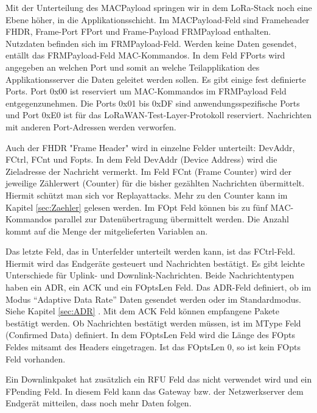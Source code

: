 \documentclass[a4paper, 12pt]{article}
\begin{document}
                Mit der Unterteilung des MACPayload springen wir in dem LoRa-Stack noch eine Ebene höher, in die 
                Applikationsschicht. Im MACPayload-Feld sind Frameheader FHDR, Frame-Port FPort und 
                Frame-Payload FRMPayload enthalten. Nutzdaten befinden sich im FRMPayload-Feld. Werden keine
                Daten gesendet, entällt das FRMPayload-Feld MAC-Kommandos. In dem Feld FPorts wird 
                angegeben an welchen Port und somit an welche Teilapplikation des Applikationsserver die Daten geleitet 
                werden sollen. Es gibt einige fest definierte Ports. Port 0x00 ist reserviert um MAC-Kommandos im FRMPayload Feld 
                entgegenzunehmen. Die Ports 0x01 bis 0xDF sind anwendungsspezifische Ports und Port 0xE0 ist für das 
                LoRaWAN-Test-Layer-Protokoll reserviert. Nachrichten mit anderen Port-Adressen werden verworfen. 

                Auch der FHDR "Frame Header" wird in einzelne Felder unterteilt: DevAddr, FCtrl, FCnt und Fopts. 
                In dem Feld DevAddr (Device Address) wird die Zieladresse der Nachricht vermerkt. Im Feld FCnt 
                (Frame Counter) wird der 
                jeweilige Zählerwert (Counter) für die bisher gezählten Nachrichten übermittelt. Hiermit schützt man sich vor 
                Replayattacks. Mehr zu den Counter kann im Kapitel \ref{sec:Zaehler}  gelesen werden. Im FOpt Feld 
                können bis zu fünf MAC-Kommandos parallel zur Datenübertragung übermittelt werden. Die Anzahl kommt auf die Menge der 
                mitgelieferten Variablen an. 

                Das letzte Feld, das in Unterfelder unterteilt werden kann, ist das FCtrl-Feld. Hiermit wird das Endgeräte 
                gesteuert und Nachrichten bestätigt. Es gibt leichte Unterschiede für Uplink- und Downlink-Nachrichten. 
                Beide Nachrichtentypen haben ein ADR, ein ACK und ein FOptsLen Feld. Das ADR-Feld definiert, 
                ob im Modus ``Adaptive Data Rate'' Daten gesendet werden oder im Standardmodus. Siehe Kapitel \ref{sec:ADR} . 
                Mit dem ACK Feld können empfangene Pakete bestätigt werden. Ob Nachrichten bestätigt werden müssen,
                ist im MType Feld (Confirmed Data) definiert. In dem FOptsLen Feld wird die Länge des FOpts Feldes mitsamt des 
                Headers eingetragen. Ist das FOptsLen 0, so ist kein FOpts Feld vorhanden.

                Ein Downlinkpaket hat zusätzlich ein RFU Feld das nicht verwendet wird und ein FPending Feld. In diesem 
                Feld kann das Gateway bzw. der Netzwerkserver dem Endgerät mitteilen, dass noch mehr Daten folgen.
\end{document}
